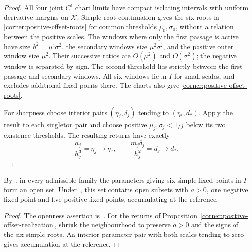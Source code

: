 \begin{proof}
All four joint $C^1$ chart limits have compact isolating intervals with uniform
derivative margins on $\mathcal K$. Simple-root continuation gives the
six roots in \eqref{corner:positive-offset-roots} for common
thresholds $\mu_0,\sigma_0$, without a relation between the positive
scales. The windows where only the first passage is active have size
$h^2=\mu^4\sigma^2$, the secondary windows size $\mu^2\sigma^2$,
and the positive outer window size $\mu^2$. Their successive ratios
are $O(\mu^2)$ and $O(\sigma^2)$; the negative window is separated
by sign. The second threshold lies strictly between the first-passage and
secondary windows. All six windows lie in $I$ for small scales,
and~\cite[Proposition~\ref*{main-prop:common-count}]{main2026} excludes
additional fixed points there. The charts also give
\eqref{corner:positive-offset-roots}.

For sharpness choose interior pairs $(\eta_j,d_j)$ tending to
$(\eta_*,d_*)$. Apply the result to each singleton pair and choose
positive $\mu_j,\sigma_j<1/j$ below its two existence thresholds.
The resulting returns have exactly
\[
 \frac{a_j}{h_j^3}=\eta_j\longrightarrow\eta_*,
 \qquad
 \frac{m_j\delta_j}{h_j^2}=d_j\longrightarrow d_*.
\]
\end{proof}

\begin{corollary}
\label{corner:open-six-cycle-region}
\label{cor:six-open}
By~\cite[Corollary~\ref*{main-cor:six-open}]{main2026}, in every admissible
family the parameters giving six simple fixed points in $I$ form an open
set. Under~\cite[(\ref*{main-eq:rank})]{main2026}, this set contains open
subsets with $a>0$, one negative fixed point and five positive fixed points,
accumulating at the reference.
\end{corollary}

\begin{proof}
The openness assertion
is~\cite[Corollary~\ref*{main-cor:six-open}]{main2026}.
For the returns of Proposition~\ref{corner:positive-offset-realization},
shrink the neighbourhood to preserve $a>0$ and the signs of the six
simple roots. An interior parameter pair with both scales tending to zero
gives accumulation at the reference.
\end{proof}
